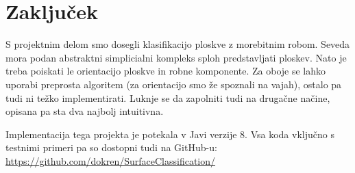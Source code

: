 \documentclass{article}
\begin{document}
\section{Zaključek}
S projektnim delom smo dosegli klasifikacijo ploskve z morebitnim robom. Seveda mora podan abstraktni simplicialni kompleks sploh predstavljati ploskev. Nato je treba poiskati le orientacijo ploskve in robne komponente. Za oboje se lahko uporabi preprosta algoritem (za orientacijo smo že spoznali na vajah), ostalo pa tudi ni težko implementirati. Luknje se da zapolniti tudi na drugačne načine, opisana pa sta dva najbolj intuitivna.

Implementacija tega projekta je potekala v Javi verzije 8. Vsa koda vključno s testnimi primeri pa so dostopni tudi na GitHub-u:\\ \url{https://github.com/dokren/SurfaceClassification/}
\end{document}
